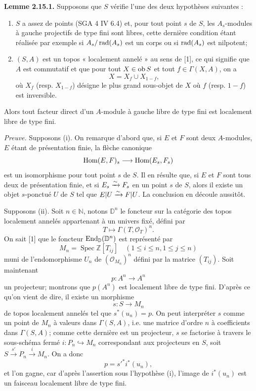 \documentclass[11pt]{article}
\newcommand{\Spec}{\operatorname{Spec}}
\begin{document}
\textbf{Lemme 2.15.1.} Supposons que \(S\) vérifie l'une des deux hypothèses suivantes :
\begin{enumerate}[label=(\roman*)]
\item \(S\) a assez de points (SGA 4 IV 6.4) et, pour tout point \(s\) de \(S\), les \(A_s\)-modules à gauche projectifs de type fini sont libres, cette dernière condition étant réalisée par exemple si \(A_s/\operatorname{rad}(A_s)\) est un corps ou si \(\operatorname{rad}(A_s)\) est nilpotent;
\item \((S,A)\) est un topos « localement annelé » au sens de [1], ce qui signifie que \(A\) est commutatif et que pour tout \(X\in\operatorname{ob} S\) et tout \(f\in\Gamma(X,A)\), on a
\[
  X=X_f\cup X_{1-f},
\]
où \(X_f\) (resp. \(X_{1-f}\)) désigne le plus grand sous-objet de \(X\) où \(f\) (resp. \(1-f\)) est inversible.
\end{enumerate}
Alors tout facteur direct d'un \(A\)-module à gauche libre de type fini est localement libre de type fini.

\emph{Preuve.} Supposons (i). On remarque d'abord que, si \(E\) et \(F\) sont deux \(A\)-modules, \(E\) étant de présentation finie, la flèche canonique
\[
  \operatorname{Hom}(E,F)_s\longrightarrow\operatorname{Hom}(E_s,F_s)
\]
est un isomorphisme pour tout point \(s\) de \(S\). Il en résulte que, si \(E\) et \(F\) sont tous deux de présentation finie, et si \(E_s\xrightarrow{\sim} F_s\) en un point \(s\) de \(S\), alors il existe un objet \(s\)-ponctué \(U\) de \(S\) tel que \(E|U\xrightarrow{\sim} F|U\). La conclusion en découle aussitôt.

Supposons (ii). Soit \(n\in\mathbb N\), notons \(\mathbb D^n\) le foncteur sur la catégorie des topos localement annelés appartenant à un univers fixé, défini par
\[
  T\longmapsto\Gamma(T,\mathcal O_T)^n.
\]
On sait [1] que le foncteur \(\operatorname{End}_{\mathbb D}(\mathbb D^n)\) est représenté par
\[
  M_n=\Spec\mathbb Z[T_{ij}]\quad(1\leq i\leq n,
  1\leq j\leq n)
\]
muni de l'endomorphisme \(U_n\) de \((\mathcal O_{M_n})^n\) défini par la matrice \((T_{ij})\). Soit maintenant
\[
  p:A^n\longrightarrow A^n
\]
un projecteur; montrons que \(p(A^n)\) est localement libre de type fini. D'après ce qu'on vient de dire, il existe un morphisme
\[
  s:S\longrightarrow M_n
\]
de topos localement annelés tel que \(s^*(u_n)=p\). On peut interpréter \(s\) comme un point de \(M_n\) à valeurs dans \(\Gamma(S,A)\), i.e. une matrice d'ordre \(n\) à coefficients dans \(\Gamma(S,A)\); comme cette dernière est un projecteur, \(s\) se factorise à travers le sous-schéma fermé \(i:P_n\hookrightarrow M_n\) correspondant aux projecteurs en \(S\), soit \(S\xrightarrow{s'}P_n\xrightarrow{i}M_n\). On a donc
\[
  p=s'^*i^*(u_n),
\]
et l'on gagne, car d'après l'assertion sous l'hypothèse (i), l'image de \(i^*(u_n)\) est un faisceau localement libre de type fini.
\end{document}
